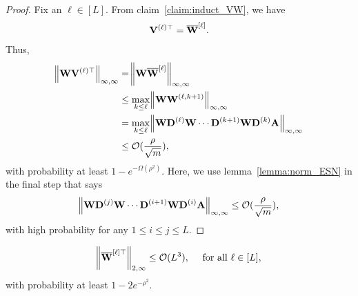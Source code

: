 \begin{proof}
	Fix an $\ell \in [L]$.
	From claim~\ref{claim:induct_VW}, we have
	\begin{align*}
		\mathbf{V}^{(\ell)\top} = \overline{\mathbf{W}}^{[\ell]}.
	\end{align*}
	Thus,
	\begin{align*}
		\norm{\mathbf{W} \mathbf{V}^{(\ell)\top}}_{\infty, \infty} &= \norm{\mathbf{W}  \overline{\mathbf{W}}^{[\ell]}}_{\infty, \infty}\\&
		\le \max_{k \le \ell} \norm{\mathbf{W}  \mathbf{W}^{(\ell, k+1)}}_{\infty, \infty} \\&
		=  \max_{k \le \ell} \norm{\mathbf{W} \mathbf{D}^{(\ell)} \mathbf{W} \cdots \mathbf{D}^{(k+1)} \mathbf{W} \mathbf{D}^{(k)} \mathbf{A}}_{\infty, \infty} \\&
		\le \mathcal{O}(\frac{\rho}{\sqrt{m}}),
	\end{align*}
	with probability at least $1 - e^{-\Omega(\rho^2)}$. Here, we use lemma~\ref{lemma:norm_ESN} in the final step that says
	\begin{align*}
		\norm{\mathbf{W} \mathbf{D}^{(j)} \mathbf{W} \cdots \mathbf{D}^{(i+1)} \mathbf{W} \mathbf{D}^{(i)} \mathbf{A}}_{\infty, \infty} \le \mathcal{O}(\frac{\rho}{\sqrt{m}}),
	\end{align*}
	with high probability for any $1 \le i \le j \le L$.
\end{proof}


\begin{claim}\label{claim:normWbracketedL_proof}
	\begin{equation*}
		\norm{\overline{\mathbf{W}}^{[\ell]\top}}_{2, \infty} \le \mathcal{O}(L^3), \quad \text{ for all } \ell \in [L],
	\end{equation*}
	with probability at least $1 - 2 e^{-\rho^2}$.
\end{claim}

